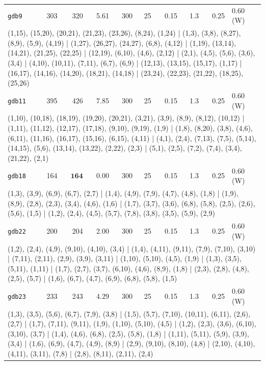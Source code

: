 \begin{longtable}{lrrrrrrrrl}
\texttt{gdb9} & 303 & 320 & 5.61 & 300 & 25 & 0.15 & 1.3 & 0.25 & 0.60\,(W) \\
\multicolumn{10}{p{0.96\linewidth}}{\tiny\raggedright\arraybackslash (1,15), (15,20), (20,21), (21,23), (23,26), (8,24), (1,24) | (1,3), (3,8), (8,27), (8,9), (5,9), (4,19) | (1,27), (26,27), (24,27), (6,8), (4,12) | (1,19), (13,14), (14,21), (21,25), (22,25) | (12,19), (6,10), (4,6), (2,12) | (2,1), (4,5), (5,6), (3,6), (3,4) | (4,10), (10,11), (7,11), (6,7), (6,9) | (12,13), (13,15), (15,17), (1,17) | (16,17), (14,16), (14,20), (18,21), (14,18) | (23,24), (22,23), (21,22), (18,25), (25,26)} \\[2pt]
\texttt{gdb11} & 395 & 426 & 7.85 & 300 & 25 & 0.15 & 1.3 & 0.25 & 0.60\,(W) \\
\multicolumn{10}{p{0.96\linewidth}}{\tiny\raggedright\arraybackslash (1,10), (10,18), (18,19), (19,20), (20,21), (3,21), (3,9), (8,9), (8,12), (10,12) | (1,11), (11,12), (12,17), (17,18), (9,10), (9,19), (1,9) | (1,8), (8,20), (3,8), (4,6), (6,11), (11,16), (16,17), (15,16), (6,15), (4,11) | (4,1), (2,4), (7,13), (7,5), (5,14), (14,15), (5,6), (13,14), (13,22), (2,22), (2,3) | (5,1), (2,5), (7,2), (7,4), (3,4), (21,22), (2,1)} \\[2pt]
\texttt{gdb18} & 164 & $\mathbf{164}$ & 0.00 & 300 & 25 & 0.15 & 1.3 & 0.25 & 0.60\,(W) \\
\multicolumn{10}{p{0.96\linewidth}}{\tiny\raggedright\arraybackslash (1,3), (3,9), (6,9), (6,7), (2,7) | (1,4), (4,9), (7,9), (4,7), (4,8), (1,8) | (1,9), (8,9), (2,8), (2,3), (3,4), (4,6), (1,6) | (1,7), (3,7), (3,6), (6,8), (5,8), (2,5), (2,6), (5,6), (1,5) | (1,2), (2,4), (4,5), (5,7), (7,8), (3,8), (3,5), (5,9), (2,9)} \\[2pt]
\texttt{gdb22} & 200 & 204 & 2.00 & 300 & 25 & 0.15 & 1.3 & 0.25 & 0.60\,(W) \\
\multicolumn{10}{p{0.96\linewidth}}{\tiny\raggedright\arraybackslash (1,2), (2,4), (4,9), (9,10), (4,10), (3,4) | (1,4), (4,11), (9,11), (7,9), (7,10), (3,10) | (7,11), (2,11), (2,9), (3,9), (3,11) | (1,10), (5,10), (4,5), (1,9) | (1,3), (3,5), (5,11), (1,11) | (1,7), (2,7), (3,7), (6,10), (4,6), (8,9), (1,8) | (2,3), (2,8), (4,8), (2,5), (5,7) | (1,6), (6,7), (4,7), (6,9), (6,8), (5,8), (1,5)} \\[2pt]
\texttt{gdb23} & 233 & 243 & 4.29 & 300 & 25 & 0.15 & 1.3 & 0.25 & 0.60\,(W) \\
\multicolumn{10}{p{0.96\linewidth}}{\tiny\raggedright\arraybackslash (1,3), (3,5), (5,6), (6,7), (7,9), (3,8) | (1,5), (5,7), (7,10), (10,11), (6,11), (2,6), (2,7) | (1,7), (7,11), (9,11), (1,9), (1,10), (5,10), (4,5) | (1,2), (2,3), (3,6), (6,10), (3,10), (3,7) | (1,4), (4,6), (6,8), (2,5), (5,8), (1,8) | (1,11), (5,11), (5,9), (3,9), (3,4) | (1,6), (6,9), (4,7), (4,9), (8,9) | (2,9), (9,10), (8,10), (4,8) | (2,10), (4,10), (4,11), (3,11), (7,8) | (2,8), (8,11), (2,11), (2,4)} \\[2pt]

\end{longtable}
